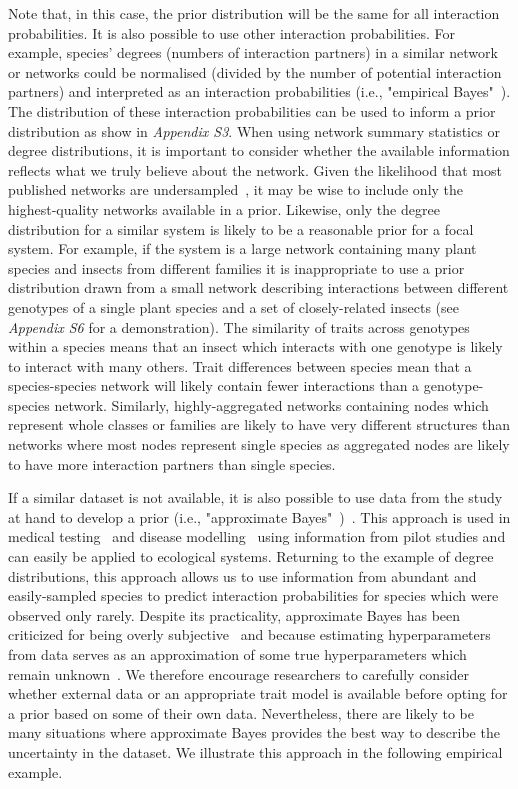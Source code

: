 \documentclass[12pt]{article}
\begin{document}
\begin{spacing}{2.0}
        Note that, in this case, the prior distribution will be the same for all interaction probabilities. It is also possible to use other interaction probabilities. For example, species' degrees (numbers of interaction partners) in a similar network or networks could be normalised (divided by the number of potential interaction partners) and interpreted as an interaction probabilities (i.e., "empirical Bayes"~\citep{Spiegelhalter2000}). The distribution of these interaction probabilities can be used to inform a prior distribution as show in \emph{Appendix S3}. When using network summary statistics or degree distributions, it is important to consider whether the available information reflects what we truly believe about the network. Given the likelihood that most published networks are undersampled~\citep{Jordano2016}, it may be wise to include only the highest-quality networks available in a prior. Likewise, only the degree distribution for a similar system is likely to be a reasonable prior for a focal system. For example, if the system is a large network containing many plant species and insects from different families it is inappropriate to use a prior distribution drawn from a small network describing interactions between different genotypes of a single plant species and a set of closely-related insects (see \emph{Appendix S6} for a demonstration). The similarity of traits across genotypes within a species means that an insect which interacts with one genotype is likely to interact with many others. Trait differences between species mean that a species-species network will likely contain fewer interactions than a genotype-species network. Similarly, highly-aggregated networks containing nodes which represent whole classes or families are likely to have very different structures than networks where most nodes represent single species as aggregated nodes are likely to have more interaction partners than single species.


        If a similar dataset is not available, it is also possible to use data from the study at hand to develop a prior (i.e., "approximate Bayes"~\citet{Gelmanblog})~\citep{Casella1985,Spiegelhalter2000}. This approach is used in medical testing~\citep{Copas1972,Spiegelhalter2000} and disease modelling~\citep{Leyland2005,Brooks2015} using information from pilot studies and can easily be applied to ecological systems. Returning to the example of degree distributions, this approach allows us to use information from abundant and easily-sampled species to predict interaction probabilities for species which were observed only rarely. Despite its practicality, approximate Bayes has been criticized for being overly subjective~\citep{Berger2006} and because estimating hyperparameters from data serves as an approximation of some true hyperparameters which remain unknown~\citep{Gelmanblog}. We therefore encourage researchers to carefully consider whether external data or an appropriate trait model is available before opting for a prior based on some of their own data. Nevertheless, there are likely to be many situations where approximate Bayes provides the best way to describe the uncertainty in the dataset. We illustrate this approach in the following empirical example.



\end{spacing}
\end{document}
